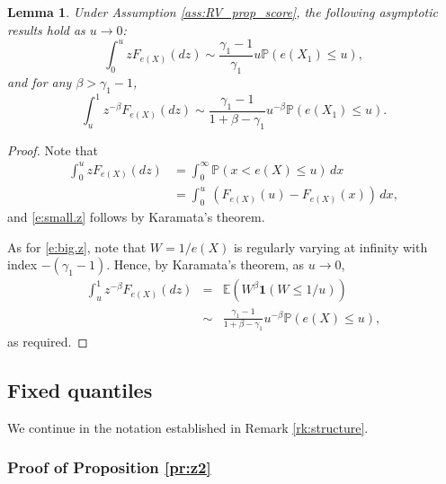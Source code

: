 \documentclass[12pt]{amsart}
\newcommand{\LFe}{F_{e(X)}}
\newcommand{\1}{\mathbbm{1}}
\newcommand{\0}{\mathbf{0}}
\newcommand{\one}{\mathbf{1}}
\newcommand{\E}{\mathbb{E}}
\theoremstyle{plain}
\newtheorem{lemma}[theorem]{Lemma}
\theoremstyle{definition}
\newcommand{\bbP}{\mathbb{P}}
\begin{document}
\begin{lemma} \label{e:regvar.est}
 Under Assumption \ref{ass:RV_prop_score},  the following asymptotic results hold as $u\to 0$:
  \begin{equation} \label{e:small.z}
  \int_0^{u} z\LFe(dz) \sim \frac{\gamma_1-1}{\gamma_1} u 
    \bbP(e(X_1)\leq u),
 \end{equation}
 and for any $\beta>\gamma_1-1$,
 \begin{equation} \label{e:big.z}
 \int_{u}^1 z^{-\beta}\LFe(dz) \sim \frac{\gamma_1-1}{1+\beta-\gamma_1}
 u^{-\beta}   \bbP(e(X_1)\leq u).
 \end{equation}

\end{lemma} 
\begin{proof}
  Note that 
  \begin{align*}
      \int_0^{u} z\LFe(dz)&=\int_0^\infty \bbP(x<e(X)\le u)\,dx\\
     &= \int_0^u \ (\LFe(u)-\LFe(x))\,dx,
  \end{align*}
and 
 \eqref{e:small.z} follows by Karamata's theorem.

As for \eqref{e:big.z}, note that $W=1/e(X)$ is regularly varying at infinity with index $-(\gamma_1-1)$.  Hence, by  Karamata's theorem, as $u\to 0$, 
\begin{eqnarray*}
 \int_{u}^1 z^{-\beta}\LFe(dz)&=&\E\left (W^\beta\one(W\le 1/u)\right)\\
 &\sim& \frac{\gamma_1-1}{1+\beta-\gamma_1}u^{-\beta}\mathbb{P}(e(X)\le u),   
\end{eqnarray*}
as required.
\end{proof}

\subsection{Fixed quantiles} \label{subsec:fixed}

We continue in the notation established in Remark \ref{rk:structure}.

%

\subsubsection{Proof of Proposition \ref{pr:z2}}
\end{document}
